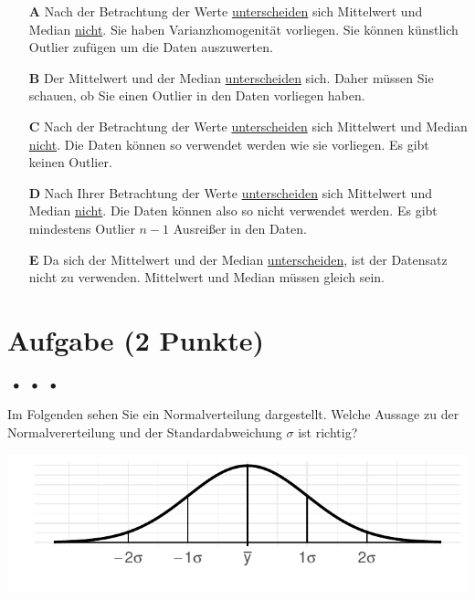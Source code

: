 \documentclass[a4paper, 9pt]{scrartcl}\usepackage[]{graphicx}\usepackage[]{xcolor}
\makeatletter
\def\maxwidth{ %
  \ifdim\Gin@nat@width>\linewidth
    \linewidth
  \else
    \Gin@nat@width
  \fi
}
\makeatother
\begin{document}
\begin{enumerate}
\item [\textbf{A} \msquare] Nach der Betrachtung der Werte \underline{unterscheiden} sich Mittelwert und Median \underline{nicht}. Sie haben Varianzhomogenität vorliegen. Sie können künstlich Outlier zufügen um die Daten auszuwerten.
\item [\textbf{B} \msquare] Der  Mittelwert und der Median \underline{unterscheiden} sich. Daher müssen Sie schauen, ob Sie einen Outlier in den Daten vorliegen haben.
\item [\textbf{C} \msquare] Nach der Betrachtung der Werte \underline{unterscheiden} sich Mittelwert und Median \underline{nicht}. Die Daten können so verwendet werden wie sie vorliegen. Es gibt keinen Outlier.
\item [\textbf{D} \msquare] Nach Ihrer Betrachtung der Werte \underline{unterscheiden} sich Mittelwert und Median \underline{nicht}. Die Daten können also so nicht verwendet werden. Es gibt mindestens Outlier $n-1$ Ausreißer in den Daten.
\item [\textbf{E} \msquare] Da sich der Mittelwert und der Median \underline{unterscheiden}, ist der Datensatz nicht zu verwenden. Mittelwert und Median müssen gleich sein.
\end{enumerate}

\section{Aufgabe \hfill (2 Punkte)}

\ifcollection
\begin{flushright}
\tiny\vspace{-2Ex}
\textbf{\examinhaltstart}
\exammodulestat $\;\bullet$
\exammodulestatbbv $\;\bullet$
\exammodulestatversuch $\;\bullet$
\exammodulebiostat
\vspace{-1Ex}
\end{flushright}
\fi




Im Folgenden sehen Sie ein Normalverteilung dargestellt. Welche Aussage zu der Normalvererteilung und der Standardabweichung $\sigma$ ist richtig?



{\centering \includegraphics[width=\maxwidth]{img/mc-distribution-02-a-1} 

}
\end{document}
